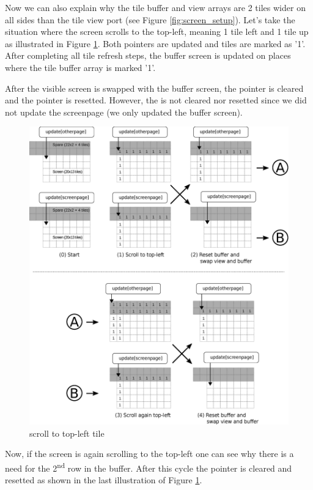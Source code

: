 \documentclass[book.tex]{subfiles}
\begin{document}
\par

Now we can also explain why the tile buffer and view arrays are 2 tiles wider on all sides than the tile view port (see Figure \ref{fig:screen_setup}). Let's take the situation where the screen scrolls to the top-left, meaning 1 tile left and 1 tile up as illustrated in Figure \ref{fig:buffer_tile_move_1}. Both  pointers are updated and tiles are marked as '1'. After completing all tile refresh steps, the buffer screen is updated on places where the tile buffer array is marked '1'. \\
\par
After the visible screen is swapped with the buffer screen, the  pointer is cleared and the pointer is resetted. However, the  is not cleared nor resetted since we did not update the screenpage (we only updated the buffer screen).\\
\begin{figure}[H]
  \centering
  \includegraphics[width=\textwidth]{imgs/drawings/buffer_tile_move.eps}
  \caption{scroll to top-left tile}
  \label{fig:buffer_tile_move_1}
\end{figure}
Now, if the screen is again scrolling to the top-left one can see why there is a need for the 2\textsuperscript{nd} row in the buffer. After this cycle the  pointer is cleared and resetted as shown in the last illustration of Figure \ref{fig:buffer_tile_move_1}.\\
\pagebreak
\end{document}
